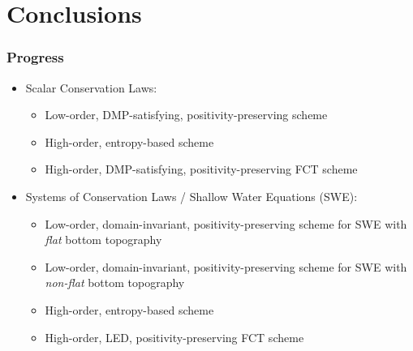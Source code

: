 \documentclass{beamer} \useoutertheme{infolines}
\begin{document}
\section{Conclusions}
\begin{frame}
\frametitle{Progress}

\begin{itemize}
  \item Scalar Conservation Laws:
    \begin{itemize}
      \item[\checked] Low-order, DMP-satisfying, positivity-preserving scheme
      \item[\checked] High-order, entropy-based scheme
      \item[\checked] High-order, DMP-satisfying, positivity-preserving FCT scheme
    \end{itemize}
 \item Systems of Conservation Laws / Shallow Water Equations (SWE):
   \begin{itemize}
     \item[\checked] Low-order, domain-invariant, positivity-preserving scheme
       for SWE with \emph{flat} bottom topography
     \item[\unchecked] Low-order, domain-invariant, positivity-preserving scheme
       for SWE with \emph{non-flat} bottom topography
     \item[\checked] High-order, entropy-based scheme
     \item[\unchecked] High-order, LED, positivity-preserving FCT scheme
   \end{itemize}
\end{itemize}

\end{frame}
\end{document}
